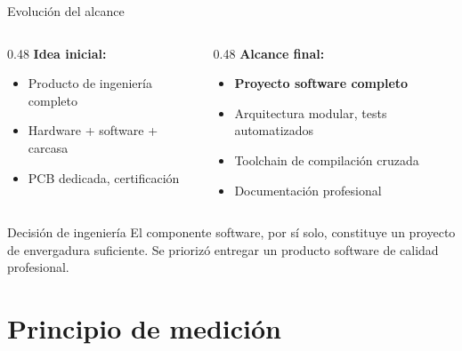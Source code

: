 \documentclass[aspectratio=169,11pt]{beamer}
\begin{document}
\begin{frame}{Evolución del alcance}

\begin{columns}[T]
\begin{column}{0.48\textwidth}
\textbf{Idea inicial:}
\begin{itemize}
    \item Producto de ingeniería completo
    \item Hardware + software + carcasa
    \item PCB dedicada, certificación
\end{itemize}
\end{column}
\begin{column}{0.48\textwidth}
\textbf{Alcance final:}
\begin{itemize}
    \item \textbf{Proyecto software completo}
    \item Arquitectura modular, tests automatizados
    \item Toolchain de compilación cruzada
    \item Documentación profesional
\end{itemize}
\end{column}
\end{columns}

\vspace{0.5cm}
\begin{block}{Decisión de ingeniería}
El componente software, por sí solo, constituye un proyecto de envergadura suficiente. Se priorizó entregar un producto software de calidad profesional.
\end{block}

\end{frame}

\section{Principio de medición}
\end{document}
